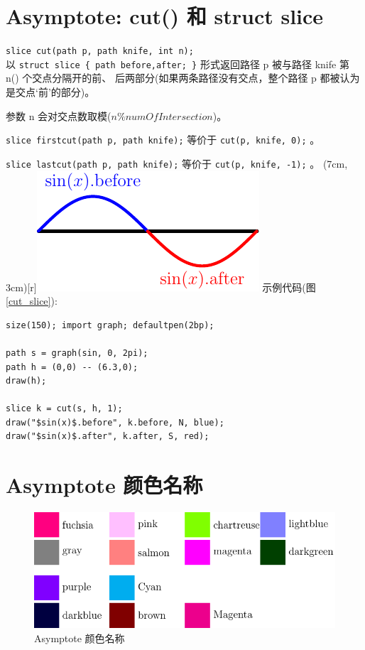 \documentclass[a4paper,11pt]{article}
\begin{document}
\section{Asymptote: cut() 和 struct slice}
\verb+slice cut(path p, path knife, int n);+\\
以 \verb+struct slice { path before,after; }+ 形式返回路径 p
被与路径 knife 第 n() 个交点分隔开的前、
后两部分(如果两条路径没有交点，整个路径 p 都被认为是交点`前'的部分)。

参数 n 会对交点数取模($n \% numOfIntersection$)。

\verb+slice firstcut(path p, path knife);+
等价于 \verb+cut(p, knife, 0);+ 。

\verb+slice lastcut(path p, path knife);+
等价于 \verb+cut(p, knife, -1);+ 。
\parpic(7cm, 3cm)[r]{\includegraphics{./figs/cut_slice.pdf}}
示例代码(图\ref{cut_slice}):
\begin{Verbatim}
size(150); import graph; defaultpen(2bp);

path s = graph(sin, 0, 2pi);
path h = (0,0) -- (6.3,0);
draw(h);

slice k = cut(s, h, 1);
draw("$sin(x)$.before", k.before, N, blue);
draw("$sin(x)$.after", k.after, S, red);
\end{Verbatim}

\section{Asymptote 颜色名称}
\begin{figure}[htpb]
\centering
\includegraphics[scale=0.7]{./figs/asy_color.pdf}
\caption{Asymptote 颜色名称}
\label{fig:asy_color}
\end{figure}
\end{document}
